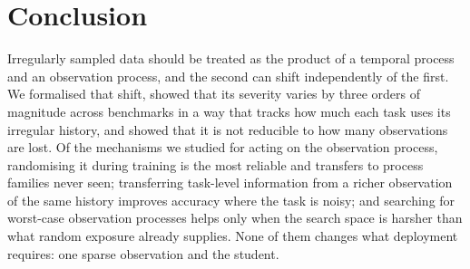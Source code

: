\documentclass[sigconf,nonacm]{acmart}
\begin{document}
\section{Conclusion}
Irregularly sampled data should be treated as the product of a temporal process and an observation process, and
the second can shift independently of the first. We formalised that shift, showed that its severity varies by
three orders of magnitude across benchmarks in a way that tracks how much each task uses its irregular history,
and showed that it is not reducible to how many observations are lost. Of the mechanisms we studied for acting
on the observation process, randomising it during training is the most reliable and transfers to process
families never seen; transferring task-level information from a richer observation of the same history improves
accuracy where the task is noisy; and searching for worst-case observation processes helps only when the search
space is harsher than what random exposure already supplies. None of them changes what deployment requires: one
sparse observation and the student.



\end{document}
